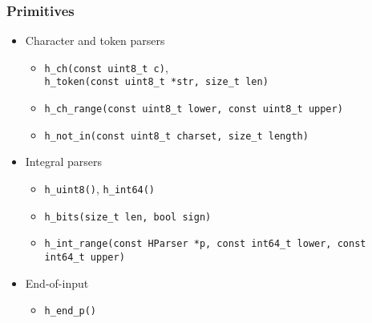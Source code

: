 \documentclass{beamer}
\begin{document}
\begin{frame}[fragile]
	\frametitle{Primitives}
	\begin{itemize}
		\item<1-> Character and token parsers
			\begin{itemize}
				\item \texttt{h\_ch(const uint8\_t c)}, \\ \texttt{h\_token(const uint8\_t *str, size\_t len)}
				\item \texttt{h\_ch\_range(const uint8\_t lower, const uint8\_t upper)}
				\item \texttt{h\_not\_in(const uint8\_t charset, size\_t length)}
			\end{itemize}
		\item<2-> Integral parsers
			\begin{itemize}
				\item \texttt{h\_uint8()}, \texttt{h\_int64()}
				\item \texttt{h\_bits(size\_t len, bool sign)}
				\item \texttt{h\_int\_range(const HParser *p, const int64\_t lower, const int64\_t upper)}
			\end{itemize}
		\item<3-> End-of-input
			\begin{itemize}
				\item \texttt{h\_end\_p()}
			\end{itemize}
	\end{itemize}
\end{frame}
\end{document}
